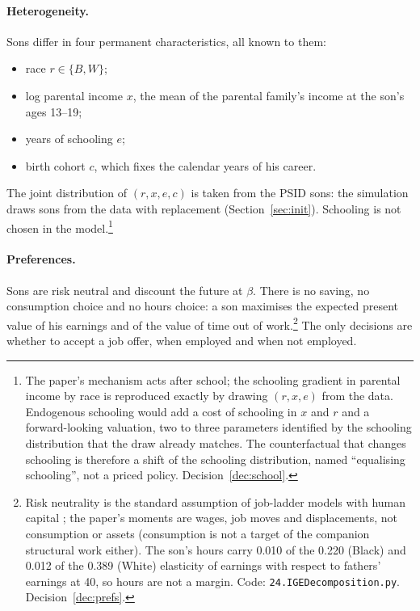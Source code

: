 \documentclass[11pt]{article}
\newcommand{\code}[1]{\texttt{#1}}
\newcommand{\1}{\mathbf{1}}
\begin{document}
\paragraph{Heterogeneity.} Sons differ in four permanent characteristics, all known to them:
\begin{itemize}
  \item race $r \in \{B, W\}$;
  \item log parental income $x$, the mean of the parental family's income at the son's ages 13--19;
  \item years of schooling $e$;
  \item birth cohort $c$, which fixes the calendar years of his career.
\end{itemize}
The joint distribution of $(r, x, e, c)$ is taken from the PSID sons: the simulation draws sons from the data with
replacement (Section~\ref{sec:init}). Schooling is not chosen in the model.\footnote{The paper's mechanism acts after
school; the schooling gradient in parental income by race is reproduced exactly by drawing $(r, x, e)$ from the data.
Endogenous schooling \citep[as in][]{abbott2019education} would add a cost of schooling in $x$ and $r$ and a forward-looking
valuation, two to three parameters identified by the schooling distribution that the draw already matches. The
counterfactual that changes schooling is therefore a shift of the schooling distribution, named ``equalising
schooling'', not a priced policy. Decision~\ref{dec:school}.}

\paragraph{Preferences.} Sons are risk neutral and discount the future at $\beta$. There is no saving, no consumption
choice and no hours choice: a son maximises the expected present value of his earnings and of the value of time out of
work.\footnote{Risk neutrality is the standard assumption of job-ladder models with human capital
\citep[e.g.][]{bagger2014tenure}; the paper's moments are wages, job moves and displacements, not consumption or assets
(consumption is not a target of the companion structural work either). The son's hours carry 0.010 of the 0.220 (Black)
and 0.012 of the 0.389 (White) elasticity of earnings with respect to fathers' earnings at 40, so hours are not a margin.
Code: \code{24.IGEDecomposition.py}. Decision~\ref{dec:prefs}.} The only decisions are whether to accept a job
offer, when employed and when not employed.
\end{document}
